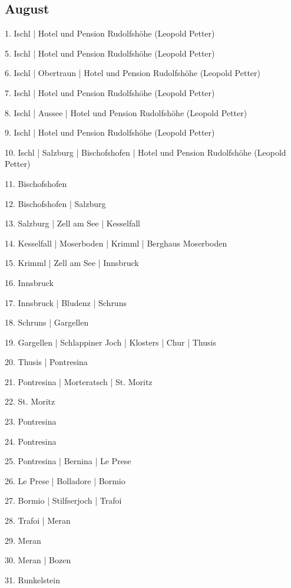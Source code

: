 \documentclass[twoside=false,titlepage=false,open=any, parskip=never, fontsize=10pt, headings=small, chapterprefix=false, appendixprefix=false, DIV=15]{scrbook}
\begin{document}
\begin{multicols}{3}
            \section*{August}
            1. Ischl | Hotel und Pension Rudolfshöhe (Leopold Petter)\par
            5. Ischl | Hotel und Pension Rudolfshöhe (Leopold Petter)\par
            6. Ischl | Obertraun | Hotel und Pension Rudolfshöhe (Leopold Petter)\par
            7. Ischl | Hotel und Pension Rudolfshöhe (Leopold Petter)\par
            8. Ischl | Aussee | Hotel und Pension Rudolfshöhe (Leopold Petter)\par
            9. Ischl | Hotel und Pension Rudolfshöhe (Leopold Petter)\par
            10. Ischl | Salzburg | Bischofshofen | Hotel und Pension Rudolfshöhe (Leopold Petter)\par
            11. Bischofshofen\par
            12. Bischofshofen | Salzburg\par
            13. Salzburg | Zell am See | Kesselfall\par
            14. Kesselfall | Moserboden | Krimml | Berghaus Moserboden\par
            15. Krimml | Zell am See | Innsbruck\par
            16. Innsbruck\par
            17. Innsbruck | Bludenz | Schruns\par
            18. Schruns | Gargellen\par
            19. Gargellen | Schlappiner Joch | Klosters | Chur | Thusis\par
            20. Thusis | Pontresina\par
            21. Pontresina | Morteratsch | St. Moritz\par
            22. St. Moritz\par
            23. Pontresina\par
            24. Pontresina\par
            25. Pontresina | Bernina | Le Prese\par
            26. Le Prese | Bolladore | Bormio\par
            27. Bormio | Stilfserjoch | Trafoi\par
            28. Trafoi | Meran\par
            29. Meran\par
            30. Meran | Bozen\par
            31. Runkelstein\par

\end{multicols}
\end{document}
